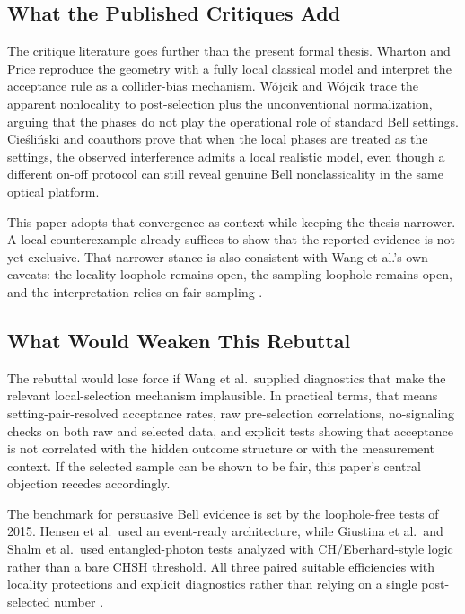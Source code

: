 \documentclass[11pt]{article}
\begin{document}
\subsection{What the Published Critiques Add}

The critique literature goes further than the present formal thesis. Wharton and Price reproduce the geometry with a fully local classical model and interpret the acceptance rule as a collider-bias mechanism. W\'ojcik and W\'ojcik trace the apparent nonlocality to post-selection plus the unconventional normalization, arguing that the phases do not play the operational role of standard Bell settings. Cie\'sli\'nski and coauthors prove that when the local phases are treated as the settings, the observed interference admits a local realistic model, even though a different on-off protocol can still reveal genuine Bell nonclassicality in the same optical platform.

This paper adopts that convergence as context while keeping the thesis narrower. A local counterexample already suffices to show that the reported evidence is not yet exclusive. That narrower stance is also consistent with Wang et al.'s own caveats: the locality loophole remains open, the sampling loophole remains open, and the interpretation relies on fair sampling \cite{wang2025}.

\subsection{What Would Weaken This Rebuttal}

The rebuttal would lose force if Wang et al.~supplied diagnostics that make the relevant local-selection mechanism implausible. In practical terms, that means setting-pair-resolved acceptance rates, raw pre-selection correlations, no-signaling checks on both raw and selected data, and explicit tests showing that acceptance is not correlated with the hidden outcome structure or with the measurement context. If the selected sample can be shown to be fair, this paper's central objection recedes accordingly.

The benchmark for persuasive Bell evidence is set by the loophole-free tests of 2015. Hensen et al.~used an event-ready architecture, while Giustina et al.~and Shalm et al.~used entangled-photon tests analyzed with CH/Eberhard-style logic rather than a bare CHSH threshold. All three paired suitable efficiencies with locality protections and explicit diagnostics rather than relying on a single post-selected number \cite{hensen2015,giustina2015,shalm2015}.
\end{document}
